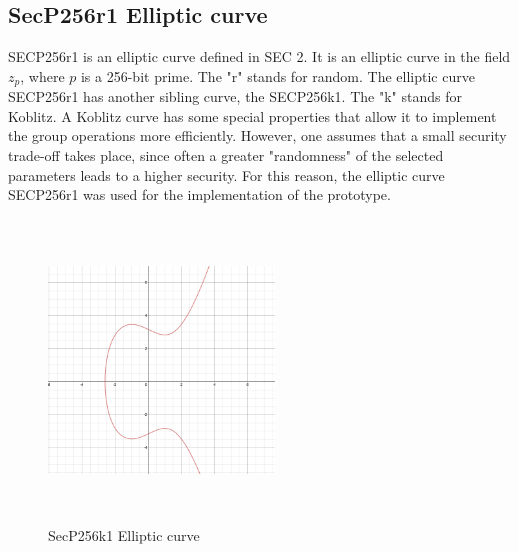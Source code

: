 \subsection{SecP256r1 Elliptic curve}
SECP256r1 is an elliptic curve defined in SEC 2. It is an elliptic curve in the field \(z_p\), where \(p\) is a 256-bit prime. The "r" stands for random. The elliptic curve SECP256r1 has another sibling curve, the SECP256k1. The "k" stands for Koblitz. A Koblitz curve has some special properties that allow it to implement the group operations more efficiently. However, one assumes that a small security trade-off takes place, since often a greater "randomness" of the selected parameters leads to a higher security. For this reason, the elliptic curve SECP256r1 was used for the implementation of the prototype.
\begin{center}
\begin{figure}[!htb]
    \centering
\includegraphics[width=6cm,height=8cm,keepaspectratio]{resources/images/NISTP256Curve.png}
    \caption{SecP256k1 Elliptic curve}
    \label{fig:DHKeyExchange}
\end{figure}
\end{center}
\newpage
